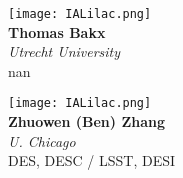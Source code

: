 \documentclass[10pt,letterpaper]{article}
\begin{document}
\begin{multicols}{2}
    \begin{minipage}[t][2in][c]{.45\textwidth}
    \centering
    \texttt{[image: IALilac.png]}\\
    \Huge \textbf{Thomas Bakx}\\
    \vspace{0.3cm}
    \Large \textit{Utrecht University} \\
    \vspace{0.5cm}
    \small nan
    \end{minipage}
    \vspace{.5cm}
    
    \begin{minipage}[t][2in][c]{.45\textwidth}
    \centering
    \texttt{[image: IALilac.png]}\\
    \huge \textbf{Zhuowen (Ben) Zhang}\\
    \vspace{0.3cm}
    \Large \textit{U. Chicago} \\
    \vspace{0.5cm}
    \small DES, DESC / LSST, DESI
    \end{minipage}
    \vspace{.5cm}
    
\end{multicols}
\end{document}
